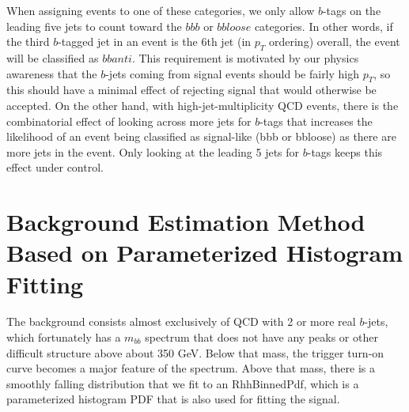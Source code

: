 When assigning events to one of these categories, we only allow $b$-tags on the leading
five jets to count toward the $bbb$ or $bbloose$ categories.  In other words, if the third
$b$-tagged jet in an event is the 6th jet (in $p_T$ ordering) overall, the event 
will be classified as $bbanti$.  This requirement is motivated by our physics awareness that
the $b$-jets coming from signal events should be fairly high $p_T$, so this should have
a minimal effect of rejecting signal that would otherwise be accepted.  On the other
hand, with high-jet-multiplicity QCD events, there is the combinatorial effect of looking across
more jets for $b$-tags that increases the likelihood of an event being classified as signal-like
(bbb or bbloose) as there are more jets in the event.  Only looking at the leading 5 jets
for $b$-tags keeps this effect under control. 


\section{Background Estimation Method Based on Parameterized Histogram Fitting}
The background consists almost exclusively of QCD with 2 or more real $b$-jets, which 
fortunately has a $m_{bb}$ spectrum that does not have any peaks or other difficult
structure above about 350 GeV.  Below that mass, the trigger turn-on curve becomes
a major feature of the spectrum.  Above that mass, there
is a smoothly falling distribution that we fit to an RhhBinnedPdf, which is a parameterized
histogram PDF that is also used for fitting the signal.

